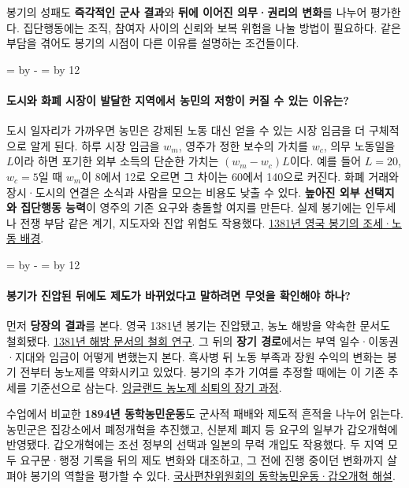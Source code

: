 \documentclass[10pt,a4paper]{article}
\newcommand{\ReserveQuestionSpace}{%
  \par\begingroup
  \dimen0=\pagegoal \advance\dimen0 by -\pagetotal
  \dimen2=\baselineskip \multiply\dimen2 by 12
  \ifdim\dimen0<\dimen2 \newpage\fi
  \endgroup}
\begin{document}
봉기의 성패도 \textbf{즉각적인 군사 결과}와 \textbf{뒤에 이어진 의무·권리의 변화}를 나누어 평가한다. 집단행동에는 조직, 참여자 사이의 신뢰와 보복 위험을 나눌 방법이 필요하다. 같은 부담을 겪어도 봉기의 시점이 다른 이유를 설명하는 조건들이다.\par

\ReserveQuestionSpace
\paragraph{도시와 화폐 시장이 발달한 지역에서 농민의 저항이 커질 수 있는 이유는?}
도시 일자리가 가까우면 농민은 강제된 노동 대신 얻을 수 있는 시장 임금을 더 구체적으로 알게 된다. 하루 시장 임금을 $w_m$, 영주가 정한 보수의 가치를 $w_c$, 의무 노동일을 $L$이라 하면 포기한 외부 소득의 단순한 가치는 $(w_m-w_c)L$이다. 예를 들어 $L=20$, $w_c=5$일 때 $w_m$이 8에서 12로 오르면 그 차이는 60에서 140으로 커진다. 화폐 거래와 장시·도시의 연결은 소식과 사람을 모으는 비용도 낮출 수 있다. \textbf{높아진 외부 선택지와 집단행동 능력}이 영주의 기존 요구와 충돌할 여지를 만든다. 실제 봉기에는 인두세나 전쟁 부담 같은 계기, 지도자와 진압 위험도 작용했다. \href{https://www.cambridge.org/core/journals/journal-of-british-studies/article/abs/peasants-revolt-and-the-government-of-england/A8D41AAB30C8E2F2689AB7DEEEB412BE}{1381년 영국 봉기의 조세·노동 배경}.\par

\ReserveQuestionSpace
\paragraph{봉기가 진압된 뒤에도 제도가 바뀌었다고 말하려면 무엇을 확인해야 하나?}
먼저 \textbf{당장의 결과}를 본다. 영국 1381년 봉기는 진압됐고, 농노 해방을 약속한 문서도 철회됐다. \href{https://ora.ox.ac.uk/objects/uuid:7aa022f4-1326-4f07-afff-b36cce95f261}{1381년 해방 문서의 철회 연구}. 그 뒤의 \textbf{장기 경로}에서는 부역 일수·이동권·지대와 임금이 어떻게 변했는지 본다. 흑사병 뒤 노동 부족과 장원 수익의 변화는 봉기 전부터 농노제를 약화시키고 있었다. 봉기의 추가 기여를 추정할 때에는 이 기존 추세를 기준선으로 삼는다. \href{https://www.cambridge.org/core/books/abs/willington-and-the-mowbrays/decline-of-serfdom-and-the-peasants-revolt/59CE0FCAD68303403D7D173207B12BD7}{잉글랜드 농노제 쇠퇴의 장기 과정}.\par

수업에서 비교한 \textbf{1894년 동학농민운동}도 군사적 패배와 제도적 흔적을 나누어 읽는다. 농민군은 집강소에서 폐정개혁을 추진했고, 신분제 폐지 등 요구의 일부가 갑오개혁에 반영됐다. 갑오개혁에는 조선 정부의 선택과 일본의 무력 개입도 작용했다. 두 지역 모두 요구문·행정 기록을 뒤의 제도 변화와 대조하고, 그 전에 진행 중이던 변화까지 살펴야 봉기의 역할을 평가할 수 있다. \href{https://contents.history.go.kr/front/ta/print.do?levelId=ta\_m52\_0040\_0030}{국사편찬위원회의 동학농민운동·갑오개혁 해설}.\par
\end{document}
